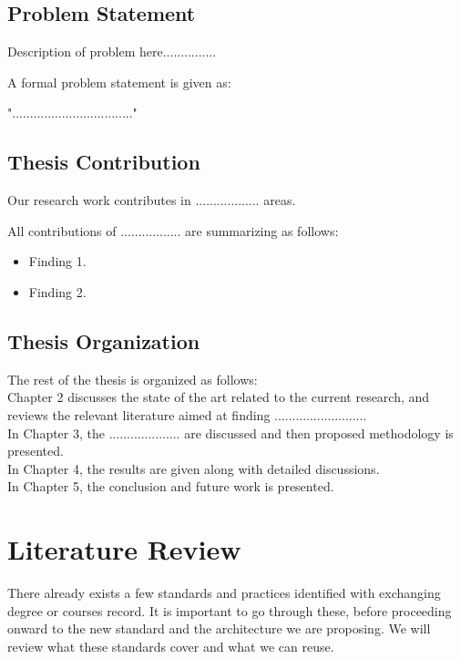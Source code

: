\documentclass[12pt,a4paper,oneside]{book}
\begin{document}
\section{Problem Statement}

Description of problem here...............

A formal problem statement is given as:

".................................."

\section{Thesis Contribution}

Our research work contributes in .................. areas.

All contributions of ................. are summarizing as follows:

\begin{itemize}
\item
Finding 1.
\item
Finding 2.
\end{itemize}

\section{Thesis Organization}

The rest of the thesis is organized as follows: \\

Chapter 2 discusses the state of the art related to the current research, and reviews the relevant literature aimed at finding .......................... \\

In Chapter 3, the .................... are discussed and then proposed methodology is presented. \\

In Chapter 4, the results are given along with detailed discussions. \\

In Chapter 5, the conclusion and future work is presented.

\chapter{Literature Review}\label{ch-work}

There already exists a few standards and practices identified with exchanging degree or courses record. It is important to go through these, before proceeding onward to the new standard and the architecture we are proposing. We will review what these standards cover and what we can reuse.
\end{document}
